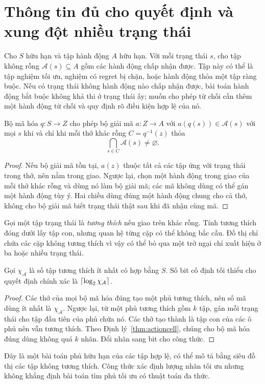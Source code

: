 \section{Thông tin đủ cho quyết định và xung đột nhiều trạng thái}\label{sec:decision}
Cho $S$ hữu hạn và tập hành động $A$ hữu hạn. Với mỗi trạng thái $s$, cho tập không rỗng $\mathcal A(s)\subseteq A$ gồm các hành động chấp nhận được. Tập này có thể là tập nghiệm tối ưu, nghiệm có regret bị chặn, hoặc hành động thỏa một tập ràng buộc. Nếu có trạng thái không hành động nào chấp nhận được, bài toán hành động bắt buộc không khả thi ở trạng thái ấy; muốn cho phép từ chối cần thêm một hành động từ chối và quy định rõ điều kiện hợp lệ của nó.

\begin{theorem}\label{thm:actioncell}
Bộ mã hóa $q:S\to Z$ cho phép bộ giải mã $a:Z\to A$ với $a(q(s))\in\mathcal A(s)$ với mọi $s$ khi và chỉ khi mỗi thớ khác rỗng $C=q^{-1}(z)$ thỏa
\[
\bigcap_{s\in C}\mathcal A(s)\ne\varnothing.
\]
\end{theorem}
\begin{proof}
Nếu bộ giải mã tồn tại, $a(z)$ thuộc tất cả các tập ứng với trạng thái trong thớ, nên nằm trong giao. Ngược lại, chọn một hành động trong giao của mỗi thớ khác rỗng và dùng nó làm bộ giải mã; các mã không dùng có thể gán một hành động tùy ý. Hai chiều dùng đúng một hành động chung cho cả thớ, không cho bộ giải mã biết trạng thái thật sau khi đã nhận cùng mã.
\end{proof}
Gọi một tập trạng thái là \emph{tương thích} nếu giao trên khác rỗng. Tính tương thích đóng dưới lấy tập con, nhưng quan hệ từng cặp có thể không bắc cầu. Đồ thị chỉ chứa các cặp không tương thích vì vậy có thể bỏ qua một trở ngại chỉ xuất hiện ở ba hoặc nhiều trạng thái.

\begin{corollary}\label{cor:cover}
Gọi $\chi_{\mathcal A}$ là số tập tương thích ít nhất có hợp bằng $S$. Số bit cố định tối thiểu cho quyết định chính xác là $\left\lceil \log_2\chi_{\mathcal A}\right\rceil$.
\end{corollary}
\begin{proof}
Các thớ của mọi bộ mã hóa đúng tạo một phủ tương thích, nên số mã dùng ít nhất là $\chi_{\mathcal A}$. Ngược lại, từ một phủ tương thích gồm $k$ tập, gán mỗi trạng thái cho tập đầu tiên của phủ chứa nó. Các thớ tạo thành là tập con của các ô phủ nên vẫn tương thích. Theo Định lý~\ref{thm:actioncell}, chúng cho bộ mã hóa đúng dùng không quá $k$ nhãn. Đổi nhãn sang bit cho công thức.
\end{proof}
Đây là một bài toán phủ hữu hạn của các tập hợp lệ, có thể mô tả bằng siêu đồ thị các tập không tương thích. Công thức xác định lượng nhãn tối ưu nhưng không khẳng định bài toán tìm phủ tối ưu có thuật toán đa thức.

